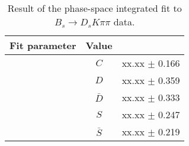 \begin{table}[h]
\centering
\caption{Result of the phase-space integrated fit to $B_s \to D_s K \pi \pi$ data.}
\begin{tabular}{c c c}
\hline
\hline
Fit parameter & Value \\
\hline
& $C$ &  xx.xx  $\pm$ 0.166\\
&$D$ &  xx.xx  $\pm$ 0.359\\
&$\bar D$ &  xx.xx  $\pm$ 0.333\\
& $S$ &  xx.xx  $\pm$ 0.247\\
& $\bar S$ &  xx.xx  $\pm$ 0.219\\
\hline
\hline
\end{tabular}
\label{table:timeFit_signal}
\end{table}